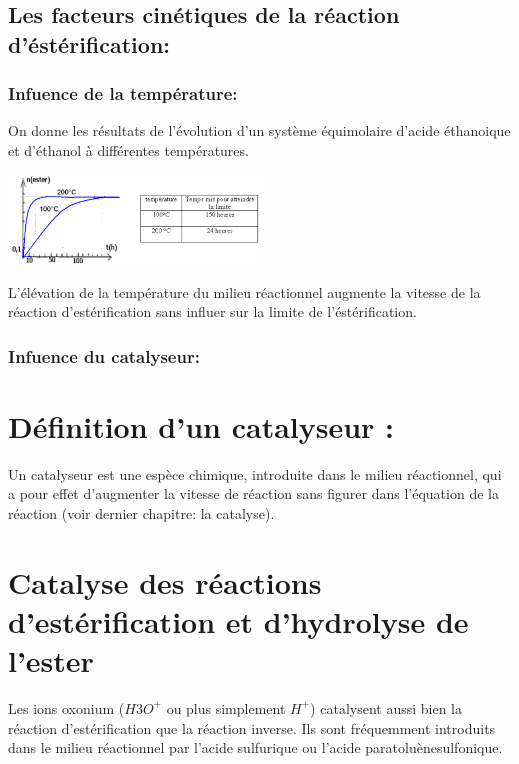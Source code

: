 \documentclass[12pt]{article}
\begin{document}
\subsection{Les facteurs cinétiques de la réaction d'éstérification:}
\subsubsection{Infuence de la température:}
On donne les résultats de l'évolution d'un système équimolaire d'acide éthanoique et d'éthanol à différentes
températures.


\begin{center}
	\includegraphics[width=0.5\textwidth]{./img/img01.png}
\end{center}



L'élévation de la température du milieu réactionnel augmente la vitesse de la réaction d'estérification sans influer sur
la limite de l'éstérification.

\subsubsection{Infuence du catalyseur:}

\section*{ Définition d'un catalyseur : }
Un catalyseur est une espèce chimique, introduite dans le milieu réactionnel, qui a pour effet d'augmenter la vitesse de réaction sans figurer dans l'équation de la réaction (voir dernier chapitre: la catalyse).

\section*{Catalyse des réactions d'estérification et d'hydrolyse de l'ester}

Les ions oxonium ($H3O^+$ ou plus simplement $H^+$) catalysent aussi bien la réaction d'estérification que la réaction inverse. Ils sont fréquemment introduits dans le milieu réactionnel par l'acide sulfurique ou l'acide paratoluènesulfonique.
\end{document}
